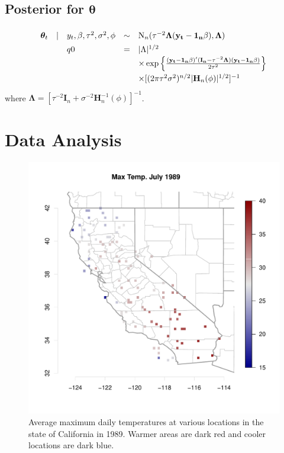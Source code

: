 \documentclass[11pt]{article}
\def\beginmyfig{\begin{figure}[h]\center}
\def\endmyfig{\end{figure}}
\newcommand{\m}[1]{\mathbf{\bm{#1}}} %
\begin{document}
\subsection{Posterior for $\m\theta$}
\def\mm{\m{y_t}-\m{1_n}\beta}
\[\def\arraystretch{1.4}
  \begin{array}{rllcl}
    \m\theta_t &|& y_t,\beta,\tau^2,\sigma^2,\phi &\sim& \text{N}_n(\tau^{-2}\m\Lambda(\mm), \m\Lambda)\\
               && q0 &=& |\Lambda|^{1/2} \\
               &&&& \times \exp\left\{\frac{(\mm)'(\m{I_n}-\tau^{-2}\m\Lambda)(\mm)}{2\tau^2}\right\}\\
               &&&& \times [(2\pi\tau^2\sigma^2)^{n/2} |\m H_n(\phi)|^{1/2}]^{-1}\\
  \end{array}
\]
where $\m\Lambda = [\tau^{-2}\m I_n + \sigma^{-2} \m H_n^{-1}(\phi)]^{-1}$.


\section{Data Analysis}
\beginmyfig 
  \includegraphics[scale=.5]{../graphs/july1989.pdf} 
  \caption{Average maximum daily temperatures at various locations in the state of California in 1989. 
  Warmer areas are dark red and cooler locations are dark blue.}
  \label{fig:dat}
\endmyfig
\end{document}

